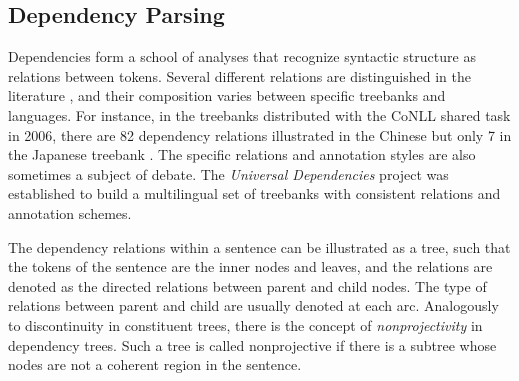 \documentclass[../document.tex]{subfiles}
\begin{document}
    \subsection{Dependency Parsing}
    Dependencies form a school of analyses that recognize syntactic structure as relations between tokens.
    Several different relations are distinguished in the literature \citep[Table 3 shows the list of dependency relations annotated in the Universal Dependencies treebanks]{de2021universal}, and their composition varies between specific treebanks and languages.
    For instance, in the treebanks distributed with the CoNLL shared task in 2006, there are 82 dependency relations illustrated in the Chinese but only 7 in the Japanese treebank \citep[Table 1]{buchholz2006conll}.
    The specific relations and annotation styles are also sometimes a subject of debate. \citep{Gerdes2016DependencyAC,Rehbein2017UniversalDA,osborne2019status}
    The \emph{Universal Dependencies} project \citep{de2021universal} was established to build a multilingual set of treebanks with consistent relations and annotation schemes.

    The dependency relations within a sentence can be illustrated as a tree, such that the tokens of the sentence are the inner nodes and leaves, and the relations are denoted as the directed relations between parent and child nodes.
    The type of relations between parent and child are usually denoted at each arc.
    Analogously to discontinuity in constituent trees, there is the concept of \emph{nonprojectivity} in dependency trees.
    Such a tree is called nonprojective if there is a subtree whose nodes are not a coherent region in the sentence.
\end{document}

